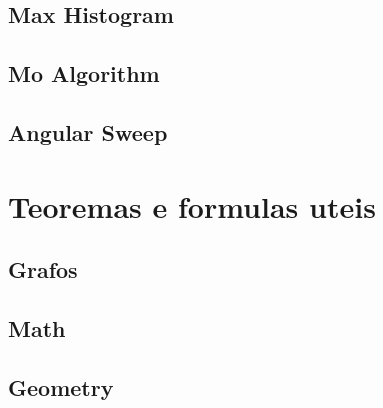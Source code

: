 \subsection{Max Histogram}
\raggedbottom
\hrulefill
\subsection{Mo Algorithm}
\raggedbottom
\hrulefill
\subsection{Angular Sweep}
\raggedbottom
\hrulefill

\section{Teoremas e formulas uteis}
\subsection{Grafos}
\raggedbottom
\hrulefill
\subsection{Math}
\raggedbottom
\hrulefill
\subsection{Geometry}
\raggedbottom
\hrulefill

